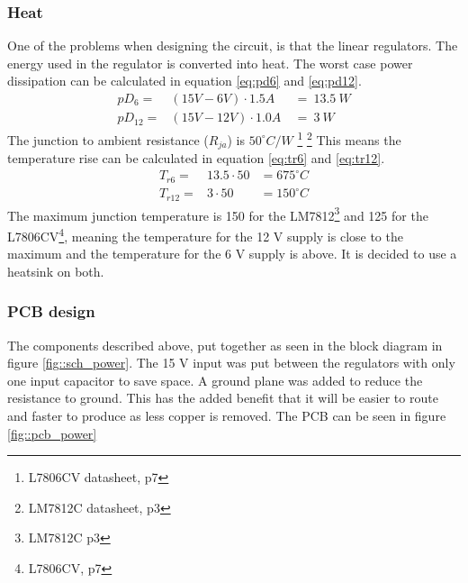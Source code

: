 \subsubsection{Heat}
One of the problems when designing the circuit, is that the linear regulators.
The energy used in the regulator is converted into heat.
The worst case power dissipation can be calculated in equation \ref{eq:pd6} and \ref{eq:pd12}.
\begin{eqnarray}
pD_{6}  =& (15V - 6V) \cdot 1.5A\ &=\ 13.5\ W \label{eq:pd6}\\
pD_{12} =& (15V - 12V)\cdot 1.0A\ &=\ 3\ W \label{eq:pd12}
\end{eqnarray}
The junction to ambient resistance ($R_{ja}$) is $50^\circ C/W$%
\footnote{L7806CV datasheet, p7}
\footnote{LM7812C datasheet, p3}
This means the temperature rise can be calculated in equation \ref{eq:tr6} and \ref{eq:tr12}.
\begin{eqnarray}
T_{r6}  =&  13.5 \cdot 50   &= 675^\circ C \label{eq:tr6}\\
T_{r12} =&  3 \cdot 50      &= 150^\circ C \label{eq:tr12}
\end{eqnarray}
The maximum junction temperature is 150 for the LM7812\footnote{LM7812C p3} and 125 for the L7806CV\footnote{L7806CV, p7}, meaning the temperature for the 12 V supply is close to the maximum and the temperature for the 6 V supply is above.
It is decided to use a heatsink on both.

\subsubsection{PCB design}
The components described above, put together as seen in the block diagram in figure \ref{fig::sch_power}. 
The 15 V input was put between the regulators with only one input capacitor to save space.
A ground plane was added to reduce the resistance to ground.
This has the added benefit that it will be easier to route and faster to produce as less copper is removed.
The PCB can be seen in figure \ref{fig::pcb_power}

